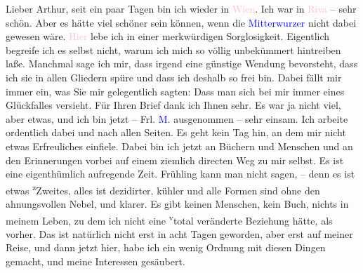 \pstart
           Lieber Arthur, seit ein paar Tagen bin ich wieder in \textcolor{pink}{Wien}{}\ledrightnote{\textcolor{pink}{Wien}}. Ich war in \textcolor{pink}{Riva}{}\ledrightnote{\textcolor{pink}{Riva del Garda}} – sehr schön. Aber es hätte viel schöner sein können, wenn die \textcolor{blue}{Mitterwurzer}{}\ledrightnote{\textcolor{blue}{Wilhelmine Mitterwurzer}} nicht dabei gewesen wäre. \textcolor{pink}{Hier}{}\ledrightnote{{$\rightarrow$}\textcolor{pink}{Wien}} lebe ich in einer
               merkwürdigen Sorglosigkeit. Eigentlich begreife ich es selbst nicht, warum ich mich
               so völlig unbekümmert hintreiben laße. Manchmal sage ich mir, dass irgend eine
               günstige Wendung bevorsteht, dass ich sie in allen Gliedern spüre und dass ich
               deshalb so frei bin. Dabei fällt mir immer ein, was Sie mir gelegentlich sagten: Dass
               man sich bei mir immer eines Glückfalles versieht. Für Ihren Brief dank ich Ihnen
               sehr. Es war ja nicht viel, aber etwas, und ich bin jetzt – Frl. \textcolor{blue}{M.}{}\ledrightnote{\textcolor{blue}{Ottilie Salten}} ausgenommen – sehr einsam. Ich arbeite ordentlich dabei
                  {\pb}und nach allen Seiten. Es
               geht kein Tag hin, an dem mir nicht etwas Erfreuliches einfiele. Dabei bin ich jetzt
               an Büchern und Menschen und an den Erinnerungen vorbei auf einem ziemlich directen
               Weg zu mir selbst. Es ist eine eigenthümlich aufregende Zeit. Frühling kann man nicht
               sagen, – denn es ist etwas \substVorne{}\textsuperscript{z}\substDazwischen{}Z\substHinten{}weites, alles ist dezidirter, kühler und alle Formen sind ohne den
               ahnungsvollen Nebel, und klarer. Es gibt keinen Menschen, kein Buch, nichts in meinem
               Leben, zu dem ich nicht eine \substVorne{}\textsuperscript{v}\substDazwischen{}t\substHinten{}otal veränderte Beziehung hätte, als vorher. Das ist natürlich nicht erst in
               acht Tagen geworden, aber erst auf meiner Reise, und dann jetzt hier, habe ich ein
               wenig Ordnung mit diesen Dingen gemacht, und meine Interessen gesäubert.\pend
           

